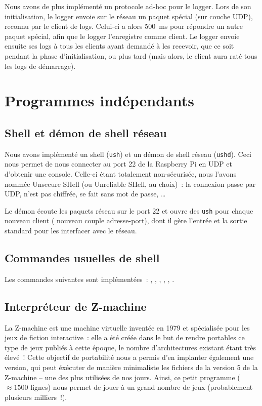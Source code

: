 \documentclass[11pt,a4paper]{article}
\newcommand{\fname}[1]{\texttt{#1}} %
\begin{document}
Nous avons de plus implémenté un protocole ad-hoc pour le logger.
Lors de son initialisation, le logger envoie sur le réseau un paquet spécial
(sur couche UDP), reconnu par le client de logs. Celui-ci a alors 500\ ms pour
répondre un autre paquet spécial, afin que le logger l'enregistre comme
client. Le logger envoie ensuite ses logs à tous les clients ayant demandé à
les recevoir, que ce soit pendant la phase d'initialisation, ou plus tard
(mais alors, le client aura raté tous les logs de démarrage).

\section{Programmes indépendants}

\subsection{Shell et démon de shell réseau}
Nous avons implémenté un shell (\fname{ush}) et un démon de shell réseau
(\fname{ushd}). Ceci nous permet de nous connecter au port 22 de la
Raspberry Pi en UDP et d'obtenir une console. Celle-ci étant totalement
non-sécurisée, nous l'avons nommée Unsecure SHell (ou Unreliable SHell,
au choix)~: la connexion passe par UDP, n'est pas chiffrée, se fait sans mot
de passe, \ldots

Le démon écoute les paquets réseau sur le port 22 et ouvre des \fname{ush}
pour chaque nouveau client (\ie{} nouveau couple adresse-port), dont il gère
l'entrée et la sortie standard pour les interfacer avec le réseau.

\subsection{Commandes usuelles de shell}
Les commandes suivantes sont implémentées~:
, , , , , .

\subsection{Interpréteur de Z-machine}
La Z-machine est une machine virtuelle inventée en 1979 et spécialisée
pour les jeux de fiction interactive~: elle a été créée dans le but de
rendre portables ce type de jeux publiés à cette époque, le nombre
d'architectures existant étant très élevé~! Cette objectif de
portabilité nous a permis d'en implanter également une version, qui
peut éxécuter de manière minimaliste les fichiers de la version 5 de
la Z-machine -- une des plus utilisées de nos jours. Ainsi, ce petit
programme ($\approx 1500$ lignes) nous permet de jouer à un grand
nombre de jeux (probablement plusieurs milliers~!).
\end{document}
